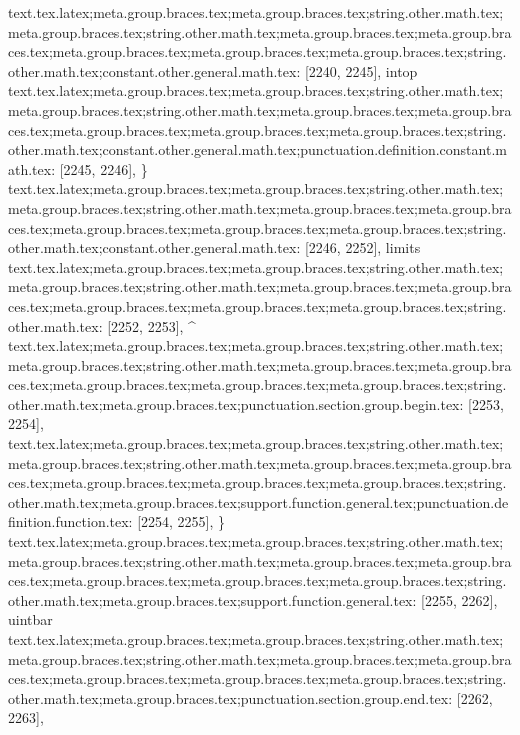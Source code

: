 {{{{{{{{{{{{{{{{{{{{{{{{{{{{{{{{{{{{{{{{{{{{{{{{{{{{{{{{{{{{{{{{{{{{{{{{text.tex.latex;meta.group.braces.tex;meta.group.braces.tex;string.other.math.tex;meta.group.braces.tex;string.other.math.tex;meta.group.braces.tex;meta.group.braces.tex;meta.group.braces.tex;meta.group.braces.tex;meta.group.braces.tex;string.other.math.tex;constant.other.general.math.tex: [2240, 2245], {intop}
text.tex.latex;meta.group.braces.tex;meta.group.braces.tex;string.other.math.tex;meta.group.braces.tex;string.other.math.tex;meta.group.braces.tex;meta.group.braces.tex;meta.group.braces.tex;meta.group.braces.tex;meta.group.braces.tex;string.other.math.tex;constant.other.general.math.tex;punctuation.definition.constant.math.tex: [2245, 2246], {\}
text.tex.latex;meta.group.braces.tex;meta.group.braces.tex;string.other.math.tex;meta.group.braces.tex;string.other.math.tex;meta.group.braces.tex;meta.group.braces.tex;meta.group.braces.tex;meta.group.braces.tex;meta.group.braces.tex;string.other.math.tex;constant.other.general.math.tex: [2246, 2252], {limits}
text.tex.latex;meta.group.braces.tex;meta.group.braces.tex;string.other.math.tex;meta.group.braces.tex;string.other.math.tex;meta.group.braces.tex;meta.group.braces.tex;meta.group.braces.tex;meta.group.braces.tex;meta.group.braces.tex;string.other.math.tex: [2252, 2253], {^}
text.tex.latex;meta.group.braces.tex;meta.group.braces.tex;string.other.math.tex;meta.group.braces.tex;string.other.math.tex;meta.group.braces.tex;meta.group.braces.tex;meta.group.braces.tex;meta.group.braces.tex;meta.group.braces.tex;string.other.math.tex;meta.group.braces.tex;punctuation.section.group.begin.tex: [2253, 2254], {{}
text.tex.latex;meta.group.braces.tex;meta.group.braces.tex;string.other.math.tex;meta.group.braces.tex;string.other.math.tex;meta.group.braces.tex;meta.group.braces.tex;meta.group.braces.tex;meta.group.braces.tex;meta.group.braces.tex;string.other.math.tex;meta.group.braces.tex;support.function.general.tex;punctuation.definition.function.tex: [2254, 2255], {\}
text.tex.latex;meta.group.braces.tex;meta.group.braces.tex;string.other.math.tex;meta.group.braces.tex;string.other.math.tex;meta.group.braces.tex;meta.group.braces.tex;meta.group.braces.tex;meta.group.braces.tex;meta.group.braces.tex;string.other.math.tex;meta.group.braces.tex;support.function.general.tex: [2255, 2262], {uintbar}
text.tex.latex;meta.group.braces.tex;meta.group.braces.tex;string.other.math.tex;meta.group.braces.tex;string.other.math.tex;meta.group.braces.tex;meta.group.braces.tex;meta.group.braces.tex;meta.group.braces.tex;meta.group.braces.tex;string.other.math.tex;meta.group.braces.tex;punctuation.section.group.end.tex: [2262, 2263], {}}
}}}}}}}}}}}}}}}}}}}}}}}}}}}}}}}}}}}}}}}}}}}}}}}}}}}}}}}}}}}}}}}}}}}}}}}}}}
